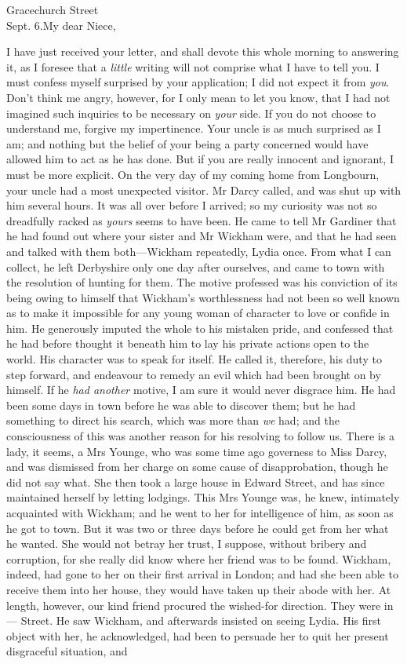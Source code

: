 \begin{mail}{Gracechurch Street\\ Sept. 6.}{My dear Niece,}

I have just received your letter, and shall devote this whole morning to answering it, as I foresee that a \textit{little} writing will not comprise what I have to tell you. I must confess myself surprised by your application; I did not expect it from \textit{you}. Don't think me angry, however, for I only mean to let you know, that I had not imagined such inquiries to be necessary on \textit{your} side. If you do not choose to understand me, forgive my impertinence. Your uncle is as much surprised as I am; and nothing but the belief of your being a party concerned would have allowed him to act as he has done. But if you are really innocent and ignorant, I must be more explicit. On the very day of my coming home from Longbourn, your uncle had a most unexpected visitor. Mr Darcy called, and was shut up with him several hours. It was all over before I arrived; so my curiosity was not so dreadfully racked as \textit{yours} seems to have been. He came to tell Mr Gardiner that he had found out where your sister and Mr Wickham were, and that he had seen and talked with them both—Wickham repeatedly, Lydia once. From what I can collect, he left Derbyshire only one day after ourselves, and came to town with the resolution of hunting for them. The motive professed was his conviction of its being owing to himself that Wickham's worthlessness had not been so well known as to make it impossible for any young woman of character to love or confide in him. He generously imputed the whole to his mistaken pride, and confessed that he had before thought it beneath him to lay his private actions open to the world. His character was to speak for itself. He called it, therefore, his duty to step forward, and endeavour to remedy an evil which had been brought on by himself. If he \textit{had another} motive, I am sure it would never disgrace him. He had been some days in town before he was able to discover them; but he had something to direct his search, which was more than \textit{we} had; and the consciousness of this was another reason for his resolving to follow us. There is a lady, it seems, a Mrs Younge, who was some time ago governess to Miss Darcy, and was dismissed from her charge on some cause of disapprobation, though he did not say what. She then took a large house in Edward Street, and has since maintained herself by letting lodgings. This Mrs Younge was, he knew, intimately acquainted with Wickham; and he went to her for intelligence of him, as soon as he got to town. But it was two or three days before he could get from her what he wanted. She would not betray her trust, I suppose, without bribery and corruption, for she really did know where her friend was to be found. Wickham, indeed, had gone to her on their first arrival in London; and had she been able to receive them into her house, they would have taken up their abode with her. At length, however, our kind friend procured the wished-for direction. They were in — Street. He saw Wickham, and afterwards insisted on seeing Lydia. His first object with her, he acknowledged, had been to persuade her to quit her present disgraceful situation, and 
\end{mail}
